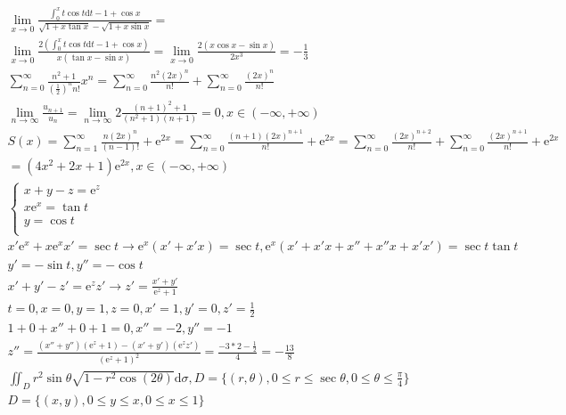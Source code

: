 \documentclass{article}
\begin{document}
\clearpage
\begin{align*}
    \lim_{x \to 0} \frac{\int_{0}^{x}t\cos t\mathrm{d}t - 1 + \cos x }{\sqrt{1+x\tan x}-\sqrt{1+x\sin x}} = \\
    \lim_{x \to 0} \frac{2(\int_{0}^{x}t\cos t\mathrm{d}t-1+\cos x)}{x(\tan x -\sin x)} = \lim_{x \to 0 }\frac{2(x\cos x-\sin x)}{2x^3} = -\frac{1}{3} \\
    \sum_{n=0}^{\infty} \frac{n^2+1}{(\frac{1}{2})^n n!} x^{n} = \sum_{n=0}^{\infty}\frac{n^2 (2x)^{n}}{n!} + \sum_{n=0}^{\infty}\frac{(2x)^n}{n!} \\
    \lim_{n \to \infty} \frac{u_{n+1}}{u_{n}} = \lim_{n \to \infty} 2\frac{(n+1)^2+1}{(n^2+1)(n+1)} = 0, x \in (-\infty,+\infty) \\
    S(x) = \sum_{n=1}^{\infty}\frac{n(2x)^n}{(n-1)!} + \mathrm{e}^{2x} = \sum_{n=0}^{\infty}\frac{(n+1)(2x)^{n+1}}{n!}+\mathrm{e}^{2x} = \sum_{n=0}^{\infty}\frac{(2x)^{n+2}}{n!}+\sum_{n=0}^{\infty}\frac{(2x)^{n+1}}{n!} + \mathrm{e}^{2x} \\
    = (4x^2+2x+1)\mathrm{e}^{2x} , x \in (-\infty,+\infty) \\  
    \left\{
        \begin{array}{rl}
            x + y - z = \mathrm{e}^{z} \\
            x\mathrm{e}^{x} = \tan t \\
            y = \cos t \\ 
        \end{array}
    \right. \\ 
    x'\mathrm{e}^x+x\mathrm{e}^{x}x'=\sec t \rightarrow \mathrm{e}^{x}(x'+x'x) = \sec t , \mathrm{e}^{x}(x'+x'x+x''+x''x+x'x') = \sec t \tan t \\ 
    y' = -\sin t , y'' = -\cos t\\
    x'+y'-z'=\mathrm{e}^{z}z' \rightarrow z' = \frac{x'+y'}{\mathrm{e}^{z}+1} \\ 
    t = 0 , x = 0 , y =  1 , z = 0 ,x' = 1,y'=0,z' = \frac{1}{2} \\
    1+0+x''+0+1= 0,x''=-2, y'' = -1 \\  
    z'' = \frac{(x''+y'')(\mathrm{e}^{z}+1)-(x'+y')(\mathrm{e}^{z}z')}{(\mathrm{e}^{z}+1)^2} = \frac{-3*2-\frac{1}{2}}{4} = -\frac{13}{8}\\
    \iint_{D}r^2\sin \theta \sqrt{1-r^2\cos (2\theta)}\mathrm{d}\sigma , D = \{(r,\theta),0 \le r \le \sec \theta,0 \le \theta \le \frac{\pi}{4}\} \\
    D = \{(x,y),0 \le y \le x , 0 \le x \le 1\} \\ 

\end{align*}
\end{document}
